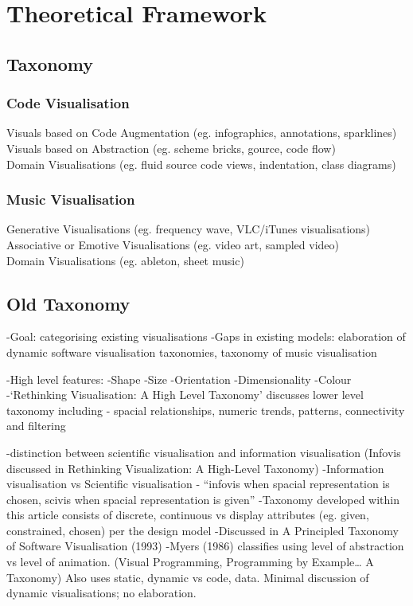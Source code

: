 \section{Theoretical Framework}
\label{sec:framework}


\subsection{Taxonomy}
\subsubsection{Code Visualisation}
Visuals based on Code Augmentation (eg. infographics, annotations, sparklines)\\
Visuals based on Abstraction (eg. scheme bricks, gource, code flow)\\
Domain Visualisations (eg. fluid source code views, indentation, class diagrams)\\
\subsubsection{Music Visualisation}
Generative Visualisations (eg. frequency wave, VLC/iTunes visualisations)\\
Associative or Emotive Visualisations (eg. video art, sampled video)\\
Domain Visualisations (eg. ableton, sheet music)\\



\subsection{Old Taxonomy}

-Goal: categorising existing visualisations
-Gaps in existing models: elaboration of dynamic software visualisation taxonomies, taxonomy of music visualisation

-High level features:
	-Shape
	-Size
	-Orientation
	-Dimensionality
	-Colour
-‘Rethinking Visualisation: A High Level Taxonomy' discusses lower level taxonomy including - spacial relationships, numeric trends, patterns, connectivity and filtering

-distinction between scientific visualisation and information visualisation (Infovis discussed in Rethinking Visualization: A High-Level Taxonomy)
-Information visualisation vs Scientific visualisation - “infovis when spacial representation is chosen, scivis when spacial representation is given”
-Taxonomy developed within this article consists of {discrete, continuous} vs display attributes (eg. given, constrained, chosen) per the design model
-Discussed in A Principled Taxonomy of Software Visualisation (1993)
-Myers (1986) classifies using level of abstraction vs level of animation. (Visual Programming, Programming by Example… A Taxonomy) Also uses {static, dynamic} vs {code, data}. Minimal discussion of dynamic visualisations; no elaboration.

